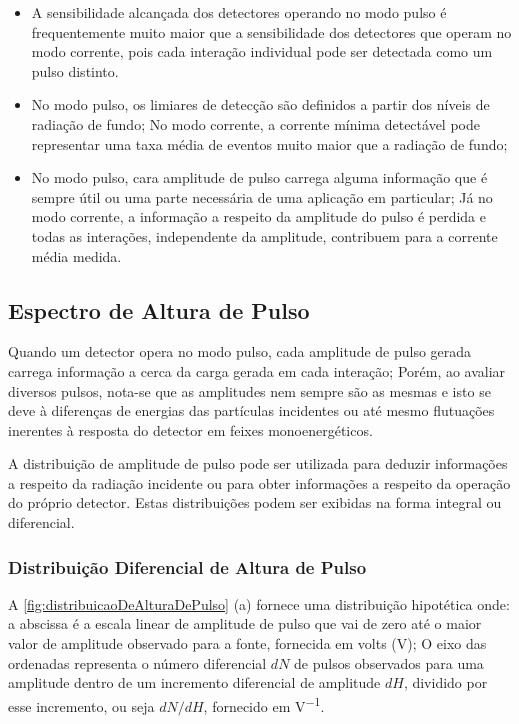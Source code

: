 \documentclass[11pt,a4paper]{article}
\begin{document}
			\begin{itemize}
				\item A sensibilidade alcançada dos detectores operando no modo pulso é frequentemente muito maior que a sensibilidade dos detectores que operam no modo corrente, pois cada interação individual pode ser detectada como um pulso distinto.
				\item No modo pulso, os limiares de detecção são definidos a partir dos níveis de radiação de fundo; No modo corrente, a corrente mínima detectável pode representar uma taxa média de eventos muito maior que a radiação de fundo;
				\item No modo pulso, cara amplitude de pulso carrega alguma informação que é sempre útil ou uma parte necessária de uma aplicação em particular; Já no modo corrente, a informação a respeito da amplitude do pulso é perdida e todas as interações, independente da amplitude, contribuem para a corrente média medida. 
			\end{itemize}

	\subsection{Espectro de Altura de Pulso}

		Quando um detector opera no modo pulso, cada amplitude de pulso gerada carrega informação a cerca da carga gerada em cada interação; Porém, ao avaliar diversos pulsos, nota-se que as amplitudes nem sempre são as mesmas e isto se deve à diferenças de energias das partículas incidentes ou até mesmo flutuações inerentes à resposta do detector em feixes monoenergéticos. 

		A distribuição de amplitude de pulso pode ser utilizada para deduzir informações a respeito da radiação incidente ou para obter informações a respeito da operação do próprio detector. Estas distribuições podem ser exibidas na forma integral ou diferencial.



		\subsubsection*{Distribuição Diferencial de Altura de Pulso}

			A  \ref{fig:distribuicaoDeAlturaDePulso} (a) fornece uma distribuição hipotética onde: a abscissa é a escala linear de amplitude de pulso que vai de zero até o maior valor de amplitude observado para a fonte, fornecida em volts (V); O eixo das ordenadas representa o número diferencial $dN$  de pulsos observados para uma amplitude dentro de um incremento diferencial de amplitude $dH$, dividido por esse incremento, ou seja $dN/dH$, fornecido em \unit{V^{-1}}.
\end{document}

